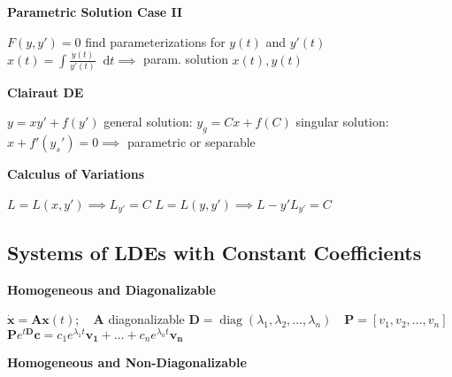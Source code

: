 \documentclass[10pt, a4paper]{article}
\newcommand*\diff{\mathop{}\!\mathrm{d}} %
\begin{document}
\begin{multicols}{2}
\vspace{2mm}
\textbf{Parametric Solution Case II}

$ F(y, y') = 0 $ \vspace{0.5mm} \newline
find parameterizations for $ y(t) $ and $ y'(t) $ \vspace{0.5mm} \newline
$ x(t) = \int \frac{\dot{y}(t)}{y'(t)} \diff t \implies $ param. solution $ x(t), y(t) $

\vspace{2mm}
\textbf{Clairaut DE}

$ y = x y' + f(y') $ \vspace{0.5mm} \newline
general solution: $ y_g = Cx + f(C) $\newline
singular solution: $ x + f'(y_s') = 0 \implies $ parametric or separable

\vspace{2mm}
\textbf{Calculus of Variations}

$ L = L(x, y') \implies	L_{y'} = C $ \vspace{0.5mm} \newline
$ L = L(y, y') \implies L - y' L_{y'} = C  $ 

\vspace{-5mm}
\subsection*{Systems of LDEs with Constant Coefficients}
\vspace{-1mm}
\textbf{Homogeneous and Diagonalizable}

$ \dot{\bm{x}} = \mathbf{A} \bm{x}(t); \quad \mathbf{A} $ diagonalizable \newline
$  \mathbf{D} = \operatorname{diag}(\lambda_1, \lambda_2, \dots, \lambda_n) \quad \mathbf{P} = [v_1, v_2, \dots, v_n] $ \vspace{1mm} \newline
$ \mathbf{P} e^{t \mathbf{D}} \bm{c} = c_1 e^{\lambda_1 t} \bm{v_1} + \dots + c_n e^{\lambda_n t} \bm{v_n} $


\vspace{1mm}
\textbf{Homogeneous and Non-Diagonalizable}


\end{multicols}
\end{document}

